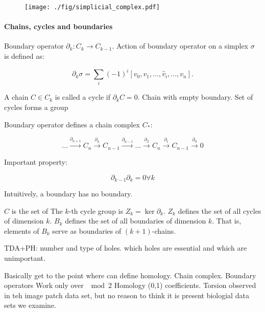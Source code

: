 \begin{figure}
\centering
\texttt{[image: ./fig/simplicial\_complex.pdf]}
\caption[Simplicial Complex]{}
\label{background:fig:simplicial_complex}
\end{figure}

\paragraph{Chains, cycles and boundaries}

Boundary operator $\partial_{k}:C_{k}\rightarrow C_{k-1}$.
Action of boundary operator on a simplex $\sigma$ is defined as: 

\begin{equation}
\partial_{k}\sigma = \displaystyle\sum_{i}(-1)^{i}[v_{0},v_{1},...,\hat{v}_{i},...,v_{n}].
\end{equation}

A chain $C\in C_{k}$ is called a cycle if $\partial_{k}C=0$.
Chain with empty boundary.
Set of cycles forms a group

Boundary operator defines a chain complex $C_{*}$:

\begin{equation}
\dots \overset{\partial_{n+1}}{\longrightarrow} C_n \overset{\partial_{n}}{\longrightarrow} C_{n-1} \overset{\partial_{n-1}}{\longrightarrow}  ... \overset{\partial_{2}}{\longrightarrow} C_n \overset{\partial_{1}}{\longrightarrow} C_{n-1} \overset{\partial_{0}}{\longrightarrow}  0
\end{equation}

Important property:

\begin{equation}
\partial_{k-1}\partial_{k} = 0 \forall k
\end{equation}

Intuitively, a boundary has no boundary.

$C$ is the set of 
The $k$-th cycle group is $Z_{k}=\ker \partial_{k}$.
$Z_{k}$ defines the set of all cycles of dimension $k$.
$B_{k}$ defines the set of all boundaries of dimension $k$.
That is, elements of $B_{k}$ serve as boundaries of $(k+1)$-chains.

TDA+PH: number and type of holes. which holes are essential and which are unimportant.

Basically get to the point where can define homology.
Chain complex.
Boundary operators
Work only over $\mod 2$ Homology (0,1) coefficients.
Torsion observed in teh image patch data set, but no reason to think it is present biologial data sets we examine.

